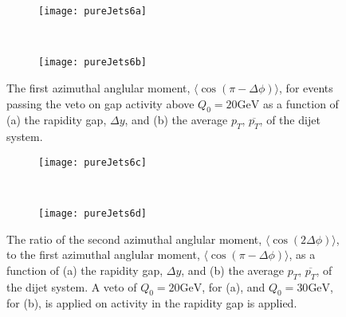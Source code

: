 	\begin{figure}[H]
		\centering
		\begin{subfigure}[b]{0.48\textwidth}
			\texttt{[image: pureJets6a]}
			\caption{}
			\label{fig:}
		\end{subfigure}
		~
		\begin{subfigure}[b]{0.48\textwidth}
			\texttt{[image: pureJets6b]}
			\caption{}
			\label{fig:}
		\end{subfigure}
		\caption{The first azimuthal anglular moment, $\langle \cos(\pi-\Delta\phi)\rangle$, for events passing the veto on gap activity
		         above $Q_0=20\text{GeV}$ as a function of (a) the rapidity gap, $\Delta y$, and (b) the average $p_T$, $\overline{p_T}$,
		         of the dijet system.}
		\label{fig:}

		\begin{subfigure}[b]{0.48\textwidth}
			\texttt{[image: pureJets6c]}
			\caption{}
			\label{fig:}
		\end{subfigure}
		~
		\begin{subfigure}[b]{0.48\textwidth}
			\texttt{[image: pureJets6d]}
			\caption{}
			\label{fig:}
		\end{subfigure}
		\caption{The ratio of the second azimuthal anglular moment, $\langle \cos(2\Delta\phi)\rangle$, to the first azimuthal
		         anglular moment, $\langle \cos(\pi-\Delta\phi)\rangle$, as a function of (a) the rapidity gap, $\Delta y$, and (b) the
		         average $p_T$, $\overline{p_T}$, of the dijet system.  A veto of $Q_0=20\text{GeV}$, for (a), and $Q_0=30\text{GeV}$,
		         for (b), is applied on activity in the rapidity gap is applied.}
		\label{fig:}
	\end{figure}

